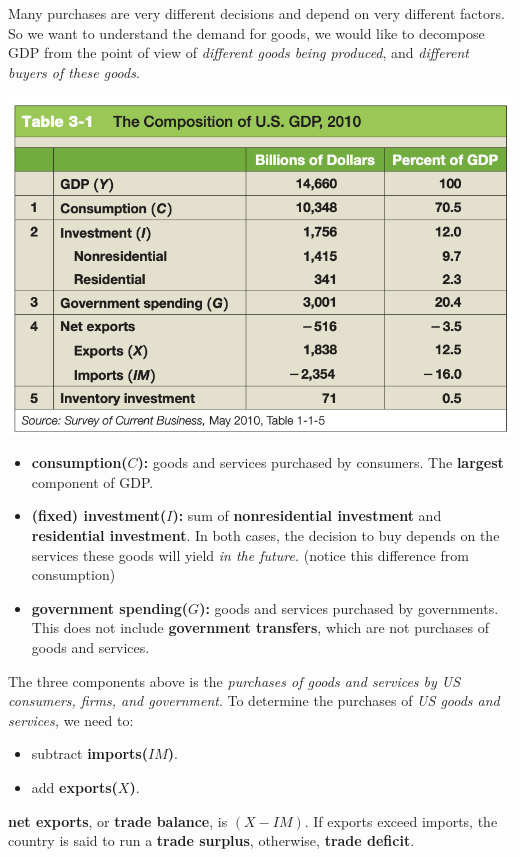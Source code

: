 \documentclass[11pt, a4paper]{ECON2123}
\begin{document}
\begin{spacing}{1.5}
    Many purchases are very different decisions and depend on
    very different factors. So we want to understand the 
    demand for goods, we would like to decompose GDP from 
    the point of view of {\it different goods being produced},
    and {\it different buyers of these goods}.
    \begin{center}
        \includegraphics[scale=0.3]{images/03-composition-GDP.png}
    \end{center}
    \begin{itemize}
        \item {\bf consumption($C$):} goods and services purchased
        by consumers. The {\bf largest} component of GDP.
        \item {\bf (fixed) investment($I$):}  sum of 
        {\bf nonresidential investment} and {\bf residential investment}.
        In both cases, the decision to buy depends on the services 
        these goods will yield {\it in the future.} (notice this 
        difference from consumption)
        \item {\bf government spending($G$):} goods and services 
        purchased by governments. This does not include 
        {\bf government transfers}, which are not purchases
        of goods and services.
    \end{itemize}

    The three components above is the {\it purchases of goods and 
    services by US consumers, firms, and government}. To determine
    the purchases of {\it US goods and services,} we need to: 
    \begin{itemize}
        \item subtract {\bf imports($IM$)}.
        \item add {\bf exports($X$)}.
    \end{itemize}
    {\bf net exports}, or {\bf trade balance}, is $(X-IM)$. 
    If exports exceed imports, the country is said to run a 
    {\bf trade surplus}, otherwise, {\bf trade deficit}.


\end{spacing}
\end{document}
